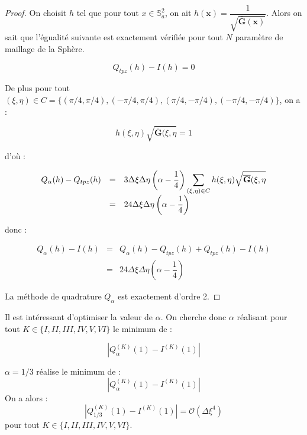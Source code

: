 \begin{proof}
On choisit $h$ tel que pour tout $x \in \mathbb{S}_a^2$, on ait $h(\mathbf{x})=\dfrac{1}{\sqrt{\overline{\mathbf{G}}(\mathbf{x})}}$. Alors on sait que l'égualité suivante est exactement vérifiée pour tout $N$ paramètre de maillage de la Sphère.

\begin{equation}
Q_{tpz}(h)-I(h)=0
\end{equation}

De plus pour tout $(\xi,\eta) \in C=\{(\pi/4,\pi/4),(-\pi/4,\pi/4),(\pi/4,-\pi/4),(-\pi/4,-\pi/4) \}$, on a :

\begin{equation}
h(\xi,\eta)\sqrt{\overline{\mathbf{G}}(\xi,\eta}=1
\end{equation}

d'où :

\begin{equation*}
\begin{array}{rcl}
Q_{\alpha}(h)-Q_{tpz}(h) & = & 3 \Delta \xi \Delta \eta \left( \alpha - \dfrac{1}{4} \right)\displaystyle\sum\limits_{(\xi,\eta)\in C} h(\xi,\eta)\sqrt{\overline{\mathbf{G}}(\xi,\eta} \\
                         & = & 24 \Delta \xi \Delta \eta \left( \alpha - \dfrac{1}{4} \right)
\end{array}
\end{equation*}

donc :

\begin{equation*}
\begin{array}{rcl}
Q_{\alpha}(h) - I(h) & = & Q_{\alpha}(h) - Q_{tpz}(h) + Q_{tpz}(h) - I(h) \\
                    & = & 24 \Delta \xi \Delta \eta \left( \alpha - \dfrac{1}{4} \right)
\end{array}
\end{equation*}

La méthode de quadrature $Q_{\alpha}$ est exactement d'ordre 2.
\end{proof}

Il est intéressant d'optimiser la valeur de $\alpha$. On cherche donc $\alpha$ réalisant pour tout $K \in \lbrace I, II, III, IV, V, VI \rbrace$ le minimum de :

\begin{equation}
|Q_{\alpha}^{(K)}(1) - I^{(K)}(1) |
\end{equation}


\begin{proposition}
$\alpha=1/3$ réalise le minimum de :
\begin{equation}
|Q_{\alpha}^{(K)}(1) - I^{(K)}(1) |
\end{equation}
On a alors :
\begin{equation}
|Q_{1/3}^{(K)}(1) - I^{(K)}(1) | = \mathcal{O}\left( \Delta \xi^4 \right)
\end{equation}
pour tout $K \in \lbrace I, II, III, IV, V, VI \rbrace$.
\end{proposition}

